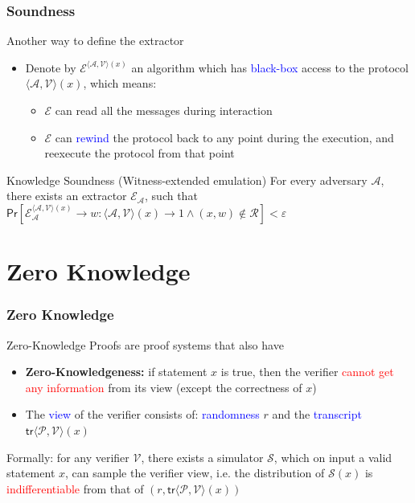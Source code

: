 \documentclass[handout]{beamer} %
\newcommand{\blue}[1]{\textcolor{blue}{#1}}
\newcommand{\dgreen}[1]{\textcolor{dgreen}{#1}}
\newcommand{\red}[1]{\textcolor{red}{#1}}
\begin{document}
\frame
{
  \frametitle{Soundness}
  \onslide<+-> Another way to define the extractor
  \begin{itemize}
    \item<+->Denote by $\mathcal{E}^{\langle\mathcal{A},\mathcal{V}\rangle(x)}$ an algorithm which has \blue{black-box} access to the protocol $\langle\mathcal{A},\mathcal{V}\rangle(x)$, which means:
    \begin{itemize}
      \item $\mathcal{E}$ can read all the messages during interaction
      \item $\mathcal{E}$ can \blue{rewind} the protocol back to any point during the execution, and reexecute the protocol from that point
    \end{itemize}
  \end{itemize}
  \onslide<+->\begin{block}{Knowledge Soundness (Witness-extended emulation)}
  For every adversary $\mathcal{A}$, there exists an extractor $\mathcal{E}_{\mathcal{A}}$, such that $\mathsf{Pr}[\mathcal{E}_{\mathcal{A}}^{\langle\mathcal{A},\mathcal{V}\rangle(x)}\to w:\langle\mathcal{A},\mathcal{V}\rangle(x)\to 1 \wedge (x,w)\notin\mathcal{R}]<\varepsilon$
  \end{block}
}

\section{Zero Knowledge}
\frame
{
  \frametitle{Zero Knowledge}
  \onslide<+-> Zero-Knowledge Proofs are proof systems that also have
  \begin{itemize}
    \item<+-> \textbf{Zero-Knowledgeness:} if \dgreen{statement $x$ is true}, then the verifier \red{cannot get any information} from its view (except the correctness of $x$)
    \item<+-> The \blue{view} of the verifier consists of: \blue{randomness} $r$ and the \blue{transcript} $\mathsf{tr}\langle\mathcal{P},\mathcal{V}\rangle(x)$
  \end{itemize}
  \onslide<+-> Formally: for any verifier $\mathcal{V}$, there exists a simulator $\mathcal{S}$, which on input a \dgreen{valid statement $x$}, can sample the verifier view, i.e. the distribution of $\mathcal{S}(x)$ is \red{indifferentiable} from that of $(r,\mathsf{tr}\langle\mathcal{P},\mathcal{V}\rangle(x))$
}
\end{document}
